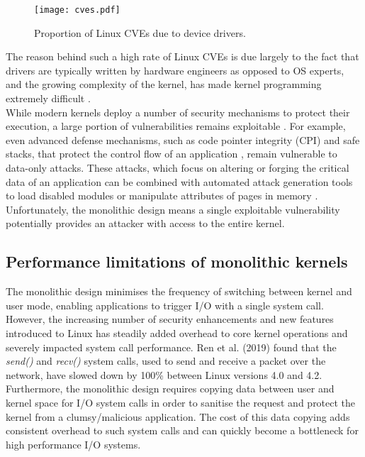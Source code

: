 \begin{figure}[h]
  \centering
  \texttt{[image: cves.pdf]}
  \caption{Proportion of Linux CVEs due to device drivers.}
  \label{f:cves}
\end{figure}

The reason behind such a high rate of Linux CVEs is due largely to the fact that
drivers are typically written by hardware engineers as opposed to OS experts, and the growing
complexity of the kernel, has made kernel programming extremely difficult \cite{Swift_MLE_02}.\\
While modern kernels deploy a number of security mechanisms to protect their execution,
a large portion of vulnerabilities remains exploitable \cite{Narayanan_HTJB_20}. For example,
even advanced defense mechanisms, such as code pointer integrity (CPI) and safe stacks,
that protect the control flow of an application \cite{Kuznetsov_SPCSS_14}, remain
vulnerable to data-only attacks. These attacks, which focus on altering or forging
the critical data of an application can be combined with automated attack
generation tools to load disabled modules or manipulate attributes of pages in memory
\cite{Ispoglou_AJP_18}. Unfortunately, the monolithic design means a single exploitable
vulnerability potentially provides an attacker with access to the entire kernel.

\subsection{Performance limitations of monolithic kernels}
The monolithic design minimises the frequency of switching between kernel and user mode, enabling 
applications to trigger I/O with a single system call. However, the increasing number of security
enhancements and new features introduced to Linux has steadily added overhead to core
kernel operations and severely impacted system call performance. Ren et al. (2019) found
that the \emph{send()} and \emph{recv()} system calls, used to send and receive a packet over the
network, have slowed down by 100\% between Linux versions 4.0 and 4.2.
Furthermore, the monolithic design requires copying data between user and kernel space for I/O system
calls in order to sanitise the request and protect the kernel from a clumsy/malicious application. 
The cost of this data copying adds consistent overhead to such system calls and can quickly
become a bottleneck for high performance I/O systems.


